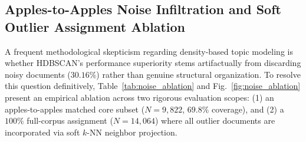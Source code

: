 \documentclass[a4paper,fleqn]{cas-dc}
\begin{document}
\subsection{Apples-to-Apples Noise Infiltration and Soft Outlier Assignment Ablation}

A frequent methodological skepticism regarding density-based topic modeling is whether HDBSCAN's performance superiority stems artifactually from discarding noisy documents ($30.16\%$) rather than genuine structural organization. To resolve this question definitively, Table~\ref{tab:noise_ablation} and Fig.~\ref{fig:noise_ablation} present an empirical ablation across two rigorous evaluation scopes: (1) an apples-to-apples matched core subset ($N=9{,}822$, $69.8\%$ coverage), and (2) a $100\%$ full-corpus assignment ($N=14{,}064$) where all outlier documents are incorporated via soft $k$-NN neighbor projection.

\begin{table}[t]
\centering
\caption{Noise ablation of HDBSCAN versus parametric baselines.}
\label{tab:noise_ablation}
\end{table}
\end{document}
